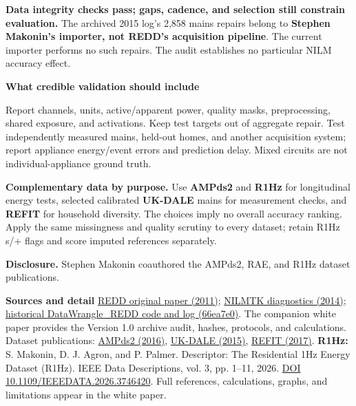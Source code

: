 \documentclass[11pt,letterpaper]{article}
\begin{document}
\textbf{Data integrity checks pass; gaps, cadence, and selection still constrain evaluation.} The archived 2015 log's 2,858 mains repairs belong to \textbf{Stephen Makonin's importer, not REDD's acquisition pipeline}. The current importer performs no such repairs. The audit establishes no particular NILM accuracy effect.

\textbf{What credible validation should include}

Report channels, units, active/apparent power, quality masks, preprocessing, shared exposure, and activations. Keep test targets out of aggregate repair. Test independently measured mains, held-out homes, and another acquisition system; report appliance energy/event errors and prediction delay. Mixed circuits are not individual-appliance ground truth.

\textbf{Complementary data by purpose.} Use \textbf{AMPds2} and \textbf{R1Hz} for longitudinal energy tests, selected calibrated \textbf{UK-DALE} mains for measurement checks, and \textbf{REFIT} for household diversity. The choices imply no overall accuracy ranking. Apply the same missingness and quality scrutiny to every dataset; retain R1Hz s/+ flags and score imputed references separately.

\textbf{Disclosure.} Stephen Makonin coauthored the AMPds2, RAE, and R1Hz dataset publications.

\vspace{2pt}
{\fontsize{8.7}{10}\selectfont
\textbf{Sources and detail}\quad
\href{https://zicokolter.com/publications/kolter2011redd.pdf}{REDD original paper (2011)}; \href{https://doi.org/10.1145/2602044.2602051}{NILMTK diagnostics (2014)}; \href{https://github.com/smakonin/DataWrangle_REDD/tree/66ea7e01e499be2bb6b88dbaf8f3cee3445cbe0d}{historical DataWrangle\_REDD code and log (66ea7e0)}. The companion white paper provides the Version 1.0 archive audit, hashes, protocols, and calculations. Dataset publications: \href{https://doi.org/10.1038/sdata.2016.37}{AMPds2 (2016)}, \href{https://doi.org/10.1038/sdata.2015.7}{UK-DALE (2015)}, \href{https://doi.org/10.1038/sdata.2016.122}{REFIT (2017)}.
\textbf{R1Hz:} S. Makonin, D. J. Agron, and P. Palmer. Descriptor: The Residential 1Hz Energy Dataset (R1Hz). IEEE Data Descriptions, vol. 3, pp. 1--11, 2026. \href{https://doi.org/10.1109/IEEEDATA.2026.3746420}{DOI 10.1109/IEEEDATA.2026.3746420}. Full references, calculations, graphs, and limitations appear in the white paper.\par}
\end{document}
